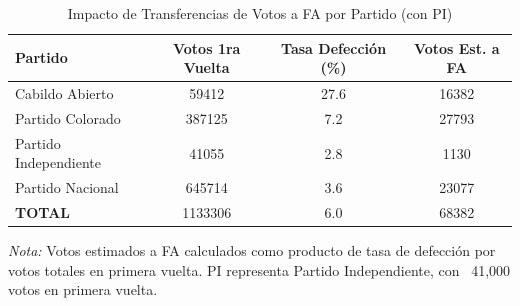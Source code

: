\begin{table}[htbp]
\centering
\caption{Impacto de Transferencias de Votos a FA por Partido (con PI)}
\label{tab:vote_impact_pi}
\begin{tabular}{lS[table-format=6.0]S[table-format=2.1]S[table-format=6.0]}
\toprule
{\textbf{Partido}} & {\textbf{Votos 1ra Vuelta}} & {\textbf{Tasa Defección (\%)}} & {\textbf{Votos Est. a FA}} \\
\midrule
Cabildo Abierto & 59412 & 27.6 & 16382 \\
Partido Colorado & 387125 & 7.2 & 27793 \\
Partido Independiente & 41055 & 2.8 & 1130 \\
Partido Nacional & 645714 & 3.6 & 23077 \\
\midrule
\textbf{TOTAL} & 1133306 & 6.0 & 68382 \\
\bottomrule
\end{tabular}
\begin{flushleft}
\small \textit{Nota:} Votos estimados a FA calculados como producto de tasa de defección por votos totales en primera vuelta. PI representa Partido Independiente, con ~41,000 votos en primera vuelta.
\end{flushleft}
\end{table}
